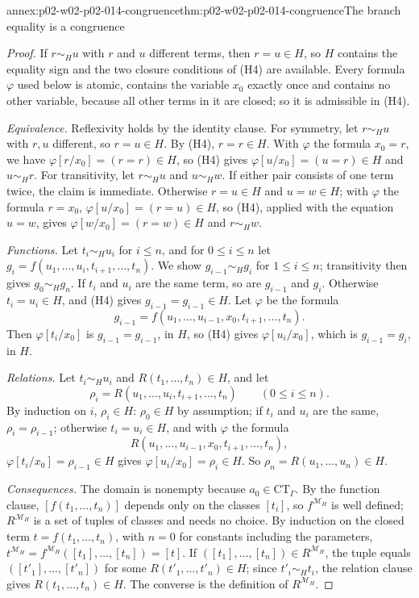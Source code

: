 \begin{annexitem}{annex:p02-w02-p02-014-congruence}{thm:p02-w02-p02-014-congruence}{The branch equality is a congruence}
\begin{proof}
If \(r\sim_H u\) with \(r\) and \(u\) different terms, then \(r=u\in H\), so
\(H\) contains the equality sign and the two closure conditions of (H4) are
available.  Every formula \(\varphi\) used below is atomic, contains the
variable \(x_0\) exactly once and contains no other variable, because all
other terms in it are closed; so it is admissible in (H4).

\emph{Equivalence.}  Reflexivity holds by the identity clause.  For
symmetry, let \(r\sim_H u\) with \(r,u\) different, so \(r=u\in H\).  By (H4),
\(r=r\in H\).  With \(\varphi\) the formula \(x_0=r\), we have
\(\varphi[r/x_0]=(r=r)\in H\), so (H4) gives \(\varphi[u/x_0]=(u=r)\in H\)
and \(u\sim_H r\).  For transitivity, let \(r\sim_H u\) and \(u\sim_H w\).
If either pair consists of one term twice, the claim is immediate.
Otherwise \(r=u\in H\) and \(u=w\in H\); with \(\varphi\) the formula
\(r=x_0\), \(\varphi[u/x_0]=(r=u)\in H\), so (H4), applied with the equation
\(u=w\), gives \(\varphi[w/x_0]=(r=w)\in H\) and \(r\sim_H w\).

\emph{Functions.}  Let \(t_i\sim_H u_i\) for \(i\leq n\), and for
\(0\leq i\leq n\) let \(g_i=f(u_1,\ldots,u_i,t_{i+1},\ldots,t_n)\).  We show
\(g_{i-1}\sim_H g_i\) for \(1\leq i\leq n\); transitivity then gives
\(g_0\sim_H g_n\).  If \(t_i\) and \(u_i\) are the same term, so are
\(g_{i-1}\) and \(g_i\).  Otherwise \(t_i=u_i\in H\), and (H4) gives
\(g_{i-1}=g_{i-1}\in H\).  Let \(\varphi\) be the formula
\[
  g_{i-1}=f(u_1,\ldots,u_{i-1},x_0,t_{i+1},\ldots,t_n).
\]
Then
\(\varphi[t_i/x_0]\) is \(g_{i-1}=g_{i-1}\), in \(H\), so (H4) gives
\(\varphi[u_i/x_0]\), which is \(g_{i-1}=g_i\), in \(H\).

\emph{Relations.}  Let \(t_i\sim_H u_i\) and \(R(t_1,\ldots,t_n)\in H\), and
let
\[
  \rho_i=R(u_1,\ldots,u_i,t_{i+1},\ldots,t_n)\qquad(0\leq i\leq n).
\]
By induction on \(i\),
\(\rho_i\in H\): \(\rho_0\in H\) by assumption; if \(t_i\) and \(u_i\) are
the same, \(\rho_i=\rho_{i-1}\); otherwise \(t_i=u_i\in H\), and with
\(\varphi\) the formula
\[
  R(u_1,\ldots,u_{i-1},x_0,t_{i+1},\ldots,t_n),
\]
\(\varphi[t_i/x_0]=\rho_{i-1}\in H\) gives
\(\varphi[u_i/x_0]=\rho_i\in H\).  So \(\rho_n=R(u_1,\ldots,u_n)\in H\).

\emph{Consequences.}  The domain is nonempty because \(a_0\in\mathrm{CT}_{\Gamma}\).
By the function clause, \([f(t_1,\ldots,t_n)]\) depends only on the classes
\([t_i]\), so \(f^{\mathcal M_H}\) is well defined; \(R^{\mathcal M_H}\) is a
set of tuples of classes and needs no choice.  By induction on the closed
term \(t=f(t_1,\ldots,t_n)\), with \(n=0\) for constants including the
parameters, \(t^{\mathcal M_H}=f^{\mathcal M_H}([t_1],\ldots,[t_n])=[t]\).  If
\(([t_1],\ldots,[t_n])\in R^{\mathcal M_H}\), the tuple equals
\(([t'_1],\ldots,[t'_n])\) for some \(R(t'_1,\ldots,t'_n)\in H\); since
\(t'_i\sim_H t_i\), the relation clause gives \(R(t_1,\ldots,t_n)\in H\).  The
converse is the definition of \(R^{\mathcal M_H}\).


\end{proof}
\end{annexitem}
